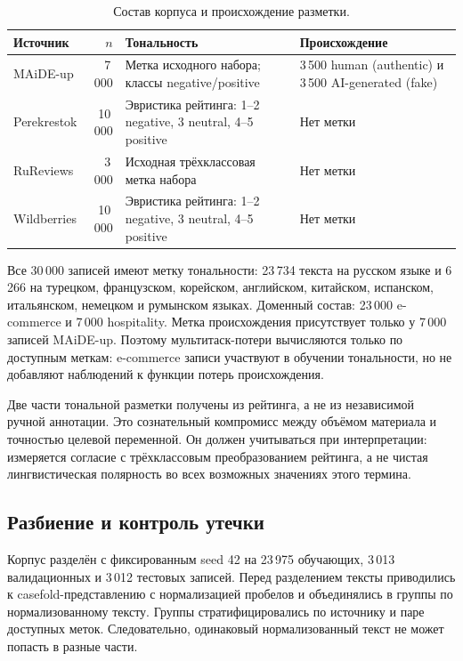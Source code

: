 \documentclass[11pt,a4paper]{article}
\begin{document}
\begin{table}[ht]
\centering
\caption{Состав корпуса и происхождение разметки.}
\label{tab:data}
\small
\begin{tabularx}{\linewidth}{@{}l r Y Y@{}}
\toprule
Источник & $n$ & Тональность & Происхождение \\
\midrule
MAiDE-up & 7\,000 & Метка исходного набора; классы negative/positive & 3\,500 human (authentic) и 3\,500 AI-generated (fake) \\
Perekrestok & 10\,000 & Эвристика рейтинга: 1--2 negative, 3 neutral, 4--5 positive & Нет метки \\
RuReviews & 3\,000 & Исходная трёхклассовая метка набора & Нет метки \\
Wildberries & 10\,000 & Эвристика рейтинга: 1--2 negative, 3 neutral, 4--5 positive & Нет метки \\
\bottomrule
\end{tabularx}
\end{table}

Все 30\,000 записей имеют метку тональности: 23\,734 текста на русском языке и 6\,266 на турецком, французском, корейском, английском, китайском, испанском, итальянском, немецком и румынском языках. Доменный состав: 23\,000 e-commerce и 7\,000 hospitality. Метка происхождения присутствует только у 7\,000 записей MAiDE-up. Поэтому мультитаск-потери вычисляются только по доступным меткам: e-commerce записи участвуют в обучении тональности, но не добавляют наблюдений к функции потерь происхождения.

Две части тональной разметки получены из рейтинга, а не из независимой ручной аннотации. Это сознательный компромисс между объёмом материала и точностью целевой переменной. Он должен учитываться при интерпретации: измеряется согласие с трёхклассовым преобразованием рейтинга, а не чистая лингвистическая полярность во всех возможных значениях этого термина.

\subsection{Разбиение и контроль утечки}

Корпус разделён с фиксированным seed 42 на 23\,975 обучающих, 3\,013 валидационных и 3\,012 тестовых записей. Перед разделением тексты приводились к casefold-представлению с нормализацией пробелов и объединялись в группы по нормализованному тексту. Группы стратифицировались по источнику и паре доступных меток. Следовательно, одинаковый нормализованный текст не может попасть в разные части.
\end{document}
